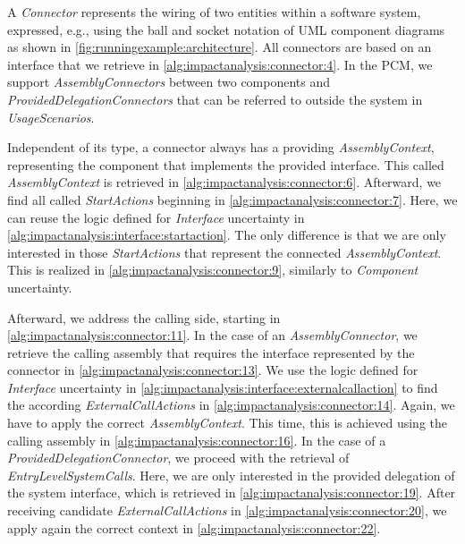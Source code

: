 A \emph{Connector} represents the wiring of two entities within a software system, expressed, e.g., using the ball and socket notation of \ac{UML} component diagrams as shown in \autoref{fig:runningexample:architecture}.
All connectors are based on an interface that we retrieve in \autoref{alg:impactanalysis:connector:4}.
In the \ac{PCM}, we support \emph{AssemblyConnectors} between two components and \emph{ProvidedDelegationConnectors} that can be referred to outside the system in \emph{UsageScenarios}.

Independent of its type, a connector always has a providing \emph{AssemblyContext}, representing the component that implements the provided interface.
This called \emph{AssemblyContext} is retrieved in \autoref{alg:impactanalysis:connector:6}.
Afterward, we find all called \emph{StartActions} beginning in \autoref{alg:impactanalysis:connector:7}.
Here, we can reuse the logic defined for \emph{Interface} uncertainty in \autoref{alg:impactanalysis:interface:startaction}.
The only difference is that we are only interested in those \emph{StartActions} that represent the connected \emph{AssemblyContext}.
This is realized in \autoref{alg:impactanalysis:connector:9}, similarly to \emph{Component} uncertainty.

Afterward, we address the calling side, starting in \autoref{alg:impactanalysis:connector:11}.
In the case of an \emph{AssemblyConnector}, we retrieve the calling assembly that requires the interface represented by the connector in \autoref{alg:impactanalysis:connector:13}.
We use the logic defined for \emph{Interface} uncertainty in \autoref{alg:impactanalysis:interface:externalcallaction} to find the according \emph{ExternalCallActions} in \autoref{alg:impactanalysis:connector:14}.
Again, we have to apply the correct \emph{AssemblyContext}.
This time, this is achieved using the calling assembly in \autoref{alg:impactanalysis:connector:16}.
In the case of a \emph{ProvidedDelegationConnector}, we proceed with the retrieval of \emph{EntryLevelSystemCalls}.
Here, we are only interested in the provided delegation of the system interface, which is retrieved in \autoref{alg:impactanalysis:connector:19}.
After receiving candidate \emph{ExternalCallActions} in \autoref{alg:impactanalysis:connector:20}, we apply again the correct context in \autoref{alg:impactanalysis:connector:22}.

